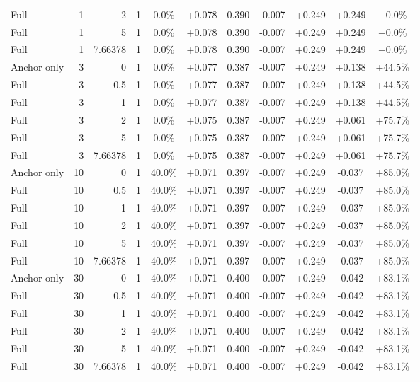 \begin{table}[htbp]
\begin{tabular}{lrrrccccccc}
Full & 1 & 2 & 1 & 0.0\% & +0.078 & 0.390 & -0.007 & +0.249 & +0.249 & +0.0\% \\
Full & 1 & 5 & 1 & 0.0\% & +0.078 & 0.390 & -0.007 & +0.249 & +0.249 & +0.0\% \\
Full & 1 & 7.66378 & 1 & 0.0\% & +0.078 & 0.390 & -0.007 & +0.249 & +0.249 & +0.0\% \\
Anchor only & 3 & 0 & 1 & 0.0\% & +0.077 & 0.387 & -0.007 & +0.249 & +0.138 & +44.5\% \\
Full & 3 & 0.5 & 1 & 0.0\% & +0.077 & 0.387 & -0.007 & +0.249 & +0.138 & +44.5\% \\
Full & 3 & 1 & 1 & 0.0\% & +0.077 & 0.387 & -0.007 & +0.249 & +0.138 & +44.5\% \\
Full & 3 & 2 & 1 & 0.0\% & +0.075 & 0.387 & -0.007 & +0.249 & +0.061 & +75.7\% \\
Full & 3 & 5 & 1 & 0.0\% & +0.075 & 0.387 & -0.007 & +0.249 & +0.061 & +75.7\% \\
Full & 3 & 7.66378 & 1 & 0.0\% & +0.075 & 0.387 & -0.007 & +0.249 & +0.061 & +75.7\% \\
Anchor only & 10 & 0 & 1 & 40.0\% & +0.071 & 0.397 & -0.007 & +0.249 & -0.037 & +85.0\% \\
Full & 10 & 0.5 & 1 & 40.0\% & +0.071 & 0.397 & -0.007 & +0.249 & -0.037 & +85.0\% \\
Full & 10 & 1 & 1 & 40.0\% & +0.071 & 0.397 & -0.007 & +0.249 & -0.037 & +85.0\% \\
Full & 10 & 2 & 1 & 40.0\% & +0.071 & 0.397 & -0.007 & +0.249 & -0.037 & +85.0\% \\
Full & 10 & 5 & 1 & 40.0\% & +0.071 & 0.397 & -0.007 & +0.249 & -0.037 & +85.0\% \\
Full & 10 & 7.66378 & 1 & 40.0\% & +0.071 & 0.397 & -0.007 & +0.249 & -0.037 & +85.0\% \\
Anchor only & 30 & 0 & 1 & 40.0\% & +0.071 & 0.400 & -0.007 & +0.249 & -0.042 & +83.1\% \\
Full & 30 & 0.5 & 1 & 40.0\% & +0.071 & 0.400 & -0.007 & +0.249 & -0.042 & +83.1\% \\
Full & 30 & 1 & 1 & 40.0\% & +0.071 & 0.400 & -0.007 & +0.249 & -0.042 & +83.1\% \\
Full & 30 & 2 & 1 & 40.0\% & +0.071 & 0.400 & -0.007 & +0.249 & -0.042 & +83.1\% \\
Full & 30 & 5 & 1 & 40.0\% & +0.071 & 0.400 & -0.007 & +0.249 & -0.042 & +83.1\% \\
Full & 30 & 7.66378 & 1 & 40.0\% & +0.071 & 0.400 & -0.007 & +0.249 & -0.042 & +83.1\% \\

\end{tabular}
\end{table}
